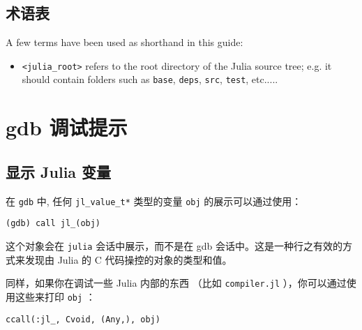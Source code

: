 \hypertarget{17259129457802099150}{}


\subsection{术语表}



A few terms have been used as shorthand in this guide:



\begin{itemize}
\item \texttt{<julia\_root>} refers to the root directory of the Julia source tree; e.g. it should contain folders such as \texttt{base}, \texttt{deps}, \texttt{src}, \texttt{test}, etc.....

\end{itemize}


\hypertarget{9756537906535455458}{}


\section{gdb 调试提示}



\hypertarget{12713077053871939955}{}


\subsection{显示 Julia 变量}



在 \texttt{gdb} 中, 任何 \texttt{jl\_value\_t*} 类型的变量 \texttt{obj} 的展示可以通过使用：




\begin{lstlisting}
(gdb) call jl_(obj)
\end{lstlisting}



这个对象会在 \texttt{julia} 会话中展示，而不是在 gdb 会话中。这是一种行之有效的方式来发现由 Julia 的 C 代码操控的对象的类型和值。



同样，如果你在调试一些 Julia 内部的东西 （比如 \texttt{compiler.jl} ），你可以通过使用这些来打印 \texttt{obj} ：




\begin{verbatim}
ccall(:jl_, Cvoid, (Any,), obj)
\end{verbatim}



